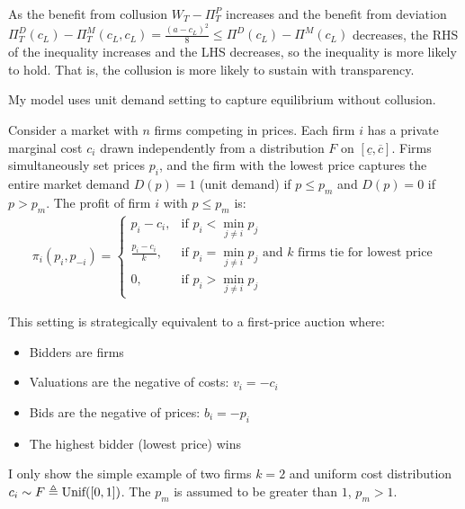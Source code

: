 \documentclass[12pt]{article}
\begin{document}
As the benefit from collusion $W_T-\Pi^P_T$ increases and the benefit from deviation $\Pi^D_T(c_L)-\Pi^M_T(c_L,c_L)=\frac{(a-c_L)^2}{8}\leq\Pi^D(c_L)-\Pi^M(c_L)$ decreases, the RHS of the inequality increases and the LHS decreases, so the inequality is more likely to hold. That is, the collusion is more likely to sustain with transparency.



My model uses unit demand setting to capture equilibrium without collusion.

Consider a market with $n$ firms competing in prices. Each firm $i$ has a private marginal cost $c_i$ drawn independently from a distribution $F$ on $[\underline{c}, \overline{c}]$. Firms simultaneously set prices $p_i$, and the firm with the lowest price captures the entire market demand $D(p) = 1$ (unit demand) if $p\leq p_m$ and $D(p)=0$ if $p>p_m$. The profit of firm $i$ with $p\leq p_m$ is:
\begin{equation}
    \begin{aligned}
        \pi_i(p_i, p_{-i}) = 
        \begin{cases}
            p_i - c_i, & \text{if } p_i < \min_{j \neq i} p_j \\
            \frac{p_i - c_i}{k}, & \text{if } p_i = \min_{j \neq i} p_j \text{ and } k \text{ firms tie for lowest price} \\
            0, & \text{if } p_i > \min_{j \neq i} p_j
        \end{cases}
    \end{aligned}
    \nonumber
\end{equation}

This setting is strategically equivalent to a first-price auction where:
\begin{itemize}
    \item Bidders are firms
    \item Valuations are the negative of costs: $v_i = -c_i$
    \item Bids are the negative of prices: $b_i = -p_i$
    \item The highest bidder (lowest price) wins
\end{itemize}

I only show the simple example of two firms $k=2$ and uniform cost distribution $c_i\sim F\triangleq\textnormal{Unif}([0,1])$. The $p_m$ is assumed to be greater than $1$, $p_m>1$.
\end{document}
